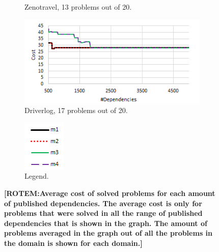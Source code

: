 \documentclass{article}
\newcommand{\rotem}[1]{\textbf{\color{red}[ROTEM:#1]}}
\theoremstyle{remark}
\begin{document}
{\begin{figure}[t!]
\begin{subfigure}[b]{0.3\textwidth}
  \caption{Zenotravel, 13 problems out of 20.}
  \label{fig:Zenotravel_cost}
\end{subfigure}\hspace{1em}
\begin{subfigure}[b]{0.3\textwidth}
\centering
  \includegraphics[width=1\linewidth]{Driverlog_cost}
  \caption{Driverlog, 17 problems out of 20.}
  \label{fig:Driverlog_cost}
\end{subfigure}\hspace{1em}
\begin{subfigure}[b]{0.3\textwidth}
\centering
  \includegraphics[scale=1.2]{Cost_legend}
  \caption{Legend.}
  \label{fig:Cost_legend}
\end{subfigure}\hspace{1em}
\caption{\rotem{Average cost of solved problems for each amount of published dependencies. The average cost is only for problems that were solved in all the range of published dependencies that is shown in the graph. The amount of problems averaged in the graph out of all the problems in the domain is shown for each domain.}}
\label{fig:Costs_figure}
\end{figure}
}
\end{document}
